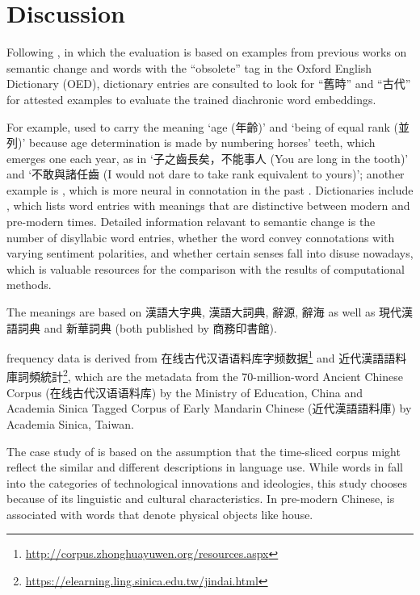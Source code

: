 

\chapter{Discussion}
Following \textcite{hamilton2016law}, in which the evaluation is based on examples from previous works on semantic change and words with the ``obsolete'' tag in the Oxford English Dictionary (OED), dictionary entries are consulted to look for ``舊時'' and ``古代'' for attested examples to evaluate the trained diachronic word embeddings.

For example,  used to carry the meaning `age (年齡)' and `being of equal rank (並列)' because age determination is made by numbering horses' teeth, which emerges one each year, as in `子之齒長矣，不能事人 (You are long in the tooth)' and `不敢與諸任齒 (I would not dare to take rank equivalent to yours)'; another example is , which is more neural in connotation in the past \parencite[前言]{wang1997gujinyiyi}. Dictionaries include \textcite{wang1997gujinyiyi,liu1992gujinyi}, which lists word entries with meanings that are distinctive between modern and pre-modern times. Detailed information relavant to semantic change is the number of disyllabic word entries, whether the word convey connotations with varying sentiment polarities, and whether certain senses fall into disuse nowadays, which is valuable resources for the comparison with the results of computational methods. 

The meanings are based on 漢語大字典, 漢語大詞典, 辭源, 辭海 as well as 現代漢語詞典 and 新華詞典 (both published by 商務印書館).

frequency data is derived from 在线古代汉语语料库字频数据\footnote{\url{http://corpus.zhonghuayuwen.org/resources.aspx}} and 近代漢語語料庫詞頻統計\footnote{\url{https://elearning.ling.sinica.edu.tw/jindai.html}}, which are the metadata from the 70-million-word Ancient Chinese Corpus (在线古代汉语语料库) by the Ministry of Education, China and Academia Sinica Tagged Corpus of Early Mandarin Chinese (近代漢語語料庫) by Academia Sinica, Taiwan.

The case study of \jia is based on the assumption that the time-sliced corpus might reflect the similar and different descriptions in language use. While words in  fall into the categories of technological innovations and ideologies, this study chooses \jia because of its linguistic and cultural characteristics. In pre-modern Chinese, \jia is associated with words that denote physical objects like house.

